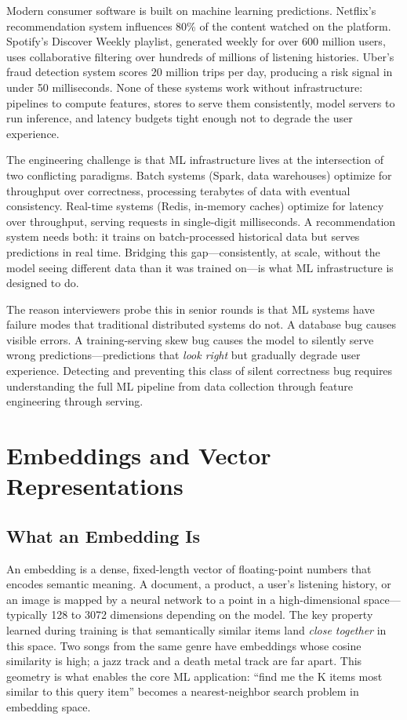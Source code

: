 \documentclass[11pt,a4paper]{article}
\begin{document}
Modern consumer software is built on machine learning predictions. Netflix's recommendation system influences 80\% of the content watched on the platform. Spotify's Discover Weekly playlist, generated weekly for over 600 million users, uses collaborative filtering over hundreds of millions of listening histories. Uber's fraud detection system scores 20 million trips per day, producing a risk signal in under 50 milliseconds. None of these systems work without infrastructure: pipelines to compute features, stores to serve them consistently, model servers to run inference, and latency budgets tight enough not to degrade the user experience.

The engineering challenge is that ML infrastructure lives at the intersection of two conflicting paradigms. Batch systems (Spark, data warehouses) optimize for throughput over correctness, processing terabytes of data with eventual consistency. Real-time systems (Redis, in-memory caches) optimize for latency over throughput, serving requests in single-digit milliseconds. A recommendation system needs both: it trains on batch-processed historical data but serves predictions in real time. Bridging this gap---consistently, at scale, without the model seeing different data than it was trained on---is what ML infrastructure is designed to do.

The reason interviewers probe this in senior rounds is that ML systems have failure modes that traditional distributed systems do not. A database bug causes visible errors. A training-serving skew bug causes the model to silently serve wrong predictions---predictions that \textit{look right} but gradually degrade user experience. Detecting and preventing this class of silent correctness bug requires understanding the full ML pipeline from data collection through feature engineering through serving.

\section{Embeddings and Vector Representations}

\subsection{What an Embedding Is}

An embedding is a dense, fixed-length vector of floating-point numbers that encodes semantic meaning. A document, a product, a user's listening history, or an image is mapped by a neural network to a point in a high-dimensional space---typically 128 to 3072 dimensions depending on the model. The key property learned during training is that semantically similar items land \textit{close together} in this space. Two songs from the same genre have embeddings whose cosine similarity is high; a jazz track and a death metal track are far apart. This geometry is what enables the core ML application: ``find me the K items most similar to this query item'' becomes a nearest-neighbor search problem in embedding space.
\end{document}
